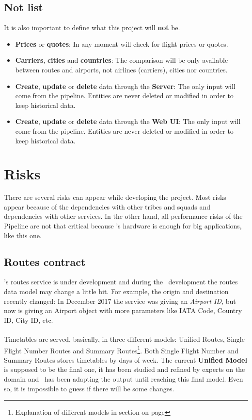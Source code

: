 \subsection{Not list} \label{not_list}

It is also important to define what this project will \textbf{not} be.

\begin{itemize}
  \item \textbf{Prices} or \textbf{quotes}: In any moment will check for flight prices or quotes.
  \item \textbf{Carriers}, \textbf{cities} and \textbf{countries}: The comparison will be only available between routes and airports, not airlines (carriers), cities nor countries.
  \item \textbf{Create}, \textbf{update} or \textbf{delete} data through the \textbf{Server}: The only input will come from the pipeline. Entities are never deleted or modified in order to keep historical data.
  \item \textbf{Create}, \textbf{update} or \textbf{delete} data through the \textbf{Web UI}: The only input will come from the pipeline. Entities are never deleted or modified in order to keep historical data.
\end{itemize}


\section{Risks}

There are several risks can appear while developing the project. Most risks appear because of the dependencies with other tribes and squads and dependencies with other services. In the other hand, all performance risks of the Pipeline are not that critical because \company's hardware is enough for big applications, like this one.

\subsection{Routes contract}

\squad's routes service is under development and during the \thesis\ development the routes data model may change a little bit. For example, the origin and destination recently changed: In December 2017 the service was giving an \textit{Airport ID}, but now is giving an Airport object with more parameters like IATA Code\cite{iata_code}, Country ID, City ID, etc.
\\\\
Timetables are served, basically, in three different models: Unified Routes, Single Flight Number Routes and Summary Routes\footnote{Explanation of different models in section  on page \pageref{routes_model}}. Both Single Flight Number and Summary Routes stores timetables by days of week. The current \textbf{Unified Model} is supposed to be the final one, it has been studied and refined by experts on the domain and \squad\ has been adapting the output until reaching this final model. Even so, it is impossible to guess if there will be some changes.

